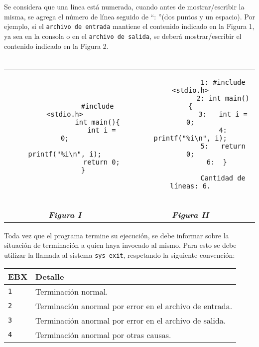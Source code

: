 \documentclass[12pt,a4paper]{article}
\begin{document}
Se considera que una línea está numerada, cuando antes de mostrar/escribir la misma, se agrega el número de línea seguido de ``: ''(dos puntos y un espacio). Por ejemplo, si el \texttt{archivo de entrada} mantiene el contenido indicado en la Figura 1, ya sea en la consola o en el \texttt{archivo de salida}, se deberá mostrar/escribir el contenido indicado en la Figura 2. \\ \\
\begin{centering}
	\begin{tabular}[t]{c|c}
		\begin{minipage}[t]{0.50\textwidth}
			\begin{verbatim}
				#include <stdio.h>
				int main(){
				  int i = 0;
				  printf("%i\n", i);
				  return 0;
				}		
			\end{verbatim}
		\end{minipage} &
		\begin{minipage}[t]{0.50\textwidth}
			\begin{verbatim}
				1: #include <stdio.h>
				2: int main(){
				3:   int i = 0;
				4:   printf("%i\n", i);
				5:   return 0;
				6:  }	
				
				Cantidad de líneas: 6.
				
			\end{verbatim}
		\end{minipage} \\
		\textbf{\textit{Figura I}} & \textbf{\textit{Figura II}}
	\end{tabular}
\end{centering}

Toda vez que el programa termine su ejecución, se debe informar sobre la situación de terminación a quien haya invocado al mismo. Para esto se debe utilizar la llamada al sistema \texttt{sys\_exit}, respetando la siguiente convención:
\begin{center}
	\begin{tabular}[t]{|l|l|}
		\hline \textbf{EBX} & \textbf{Detalle} \\ \hline
		\texttt{1} & Terminación normal. \\ \hline
		\texttt{2} & Terminación anormal por error en el archivo de entrada. \\ \hline
		\texttt{3} & Terminación anormal por error en el archivo de salida.\\ \hline
		\texttt{4} & Terminación anormal por otras causas.\\ \hline
	\end{tabular}
\end{center}
\end{document}
